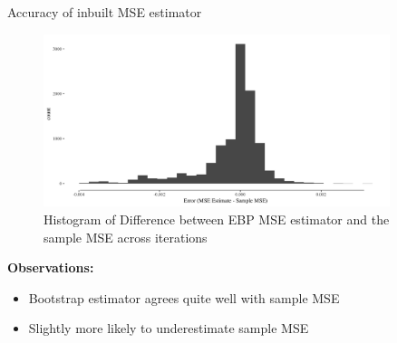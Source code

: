 \documentclass[fleqn,final]{beamer}
\newcommand{\Pheight}{\rule[-5mm]{0cm}{1cm}}
\begin{document}
\begin{frame}
\begin{columns}[t]
\begin{column}{.3\linewidth}
  \begin{block}{ Accuracy of inbuilt MSE estimator \Pheight}
	\begin{center}
	\begin{figure}
		\includegraphics[width=0.9\textwidth]{HistMSE}
		\caption{Histogram of Difference between EBP MSE estimator and the sample MSE across iterations}
	\end{figure}
\end{center}
   \end{block}
\textbf{Observations:}
\begin{itemize}
	\item Bootstrap estimator agrees quite well with sample MSE
	\item Slightly more likely to underestimate sample MSE
\end{itemize}

\end{column}

%
%

\end{columns}

\end{frame}
\end{document}
